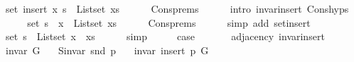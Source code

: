 \begin{isabellebody}
\ {\isachardoublequoteopen}{\isachardot}{\kern0pt}{\isachardot}{\kern0pt}{\isachardot}{\kern0pt}\ {\isacharequal}{\kern0pt}\ set\ {\isacharparenleft}{\kern0pt}insert\ x\ s{\isacharparenright}{\kern0pt}\ {\isasymunion}\ List{\isachardot}{\kern0pt}set\ xs{\isachardoublequoteclose}\isanewline
\ \ \ \ \isamarkupfalse%
\ Cons{\isachardot}{\kern0pt}prems\isanewline
\ \ \ \ \isamarkupfalse%
\ {\isacharparenleft}{\kern0pt}intro\ invar{\isacharunderscore}{\kern0pt}insert\ Cons{\isachardot}{\kern0pt}hyps{\isacharparenright}{\kern0pt}\isanewline
\ \ \isamarkupfalse%
\ \isamarkupfalse%
\ {\isachardoublequoteopen}{\isachardot}{\kern0pt}{\isachardot}{\kern0pt}{\isachardot}{\kern0pt}\ {\isacharequal}{\kern0pt}\ set\ s\ {\isasymunion}\ {\isacharbraceleft}{\kern0pt}x{\isacharbraceright}{\kern0pt}\ {\isasymunion}\ List{\isachardot}{\kern0pt}set\ xs{\isachardoublequoteclose}\isanewline
\ \ \ \ \isamarkupfalse%
\ Cons{\isachardot}{\kern0pt}prems\isanewline
\ \ \ \ \isamarkupfalse%
\ {\isacharparenleft}{\kern0pt}simp\ add{\isacharcolon}{\kern0pt}\ set{\isacharunderscore}{\kern0pt}insert{\isacharparenright}{\kern0pt}\isanewline
\ \ \isamarkupfalse%
\ \isamarkupfalse%
\ {\isachardoublequoteopen}{\isachardot}{\kern0pt}{\isachardot}{\kern0pt}{\isachardot}{\kern0pt}\ {\isacharequal}{\kern0pt}\ set\ s\ {\isasymunion}\ List{\isachardot}{\kern0pt}set\ {\isacharparenleft}{\kern0pt}x\ {\isacharhash}{\kern0pt}\ xs{\isacharparenright}{\kern0pt}{\isachardoublequoteclose}\isanewline
\ \ \ \ \isamarkupfalse%
\ simp\isanewline
\ \ \isamarkupfalse%
\ \isamarkupfalse%
\ {\isacharquery}{\kern0pt}case\isanewline
\ \ \ \ \isacommand{{\isachardot}{\kern0pt}}\isamarkupfalse%
\isanewline
{}\isamarkupfalse%
%
\endisatagproof
{\isafoldproof}%
%
\isadelimproof
\isanewline
%
\endisadelimproof
\isanewline
{}\isamarkupfalse%
\ {\isacharparenleft}{\kern0pt}\ adjacency{\isacharparenright}{\kern0pt}\ invar{\isacharunderscore}{\kern0pt}insert{\isacharunderscore}{\kern0pt}{}{\isacharcolon}{\kern0pt}\isanewline
\ \ \ {\isachardoublequoteopen}invar\ G{\isachardoublequoteclose}\isanewline
\ \ \ {\isachardoublequoteopen}S{\isachardot}{\kern0pt}invar\ {\isacharparenleft}{\kern0pt}snd\ p{\isacharparenright}{\kern0pt}{\isachardoublequoteclose}\isanewline
\ \ \ {\isachardoublequoteopen}invar\ {\isacharparenleft}{\kern0pt}insert{\isacharunderscore}{\kern0pt}{}\ p\ G{\isacharparenright}{\kern0pt}{\isachardoublequoteclose}\isanewline

\end{isabellebody}
